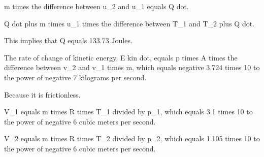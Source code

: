 m times the difference between u_2 and u_1 equals Q dot.

Q dot plus m times u_1 times the difference between T_1 and T_2 plus Q dot.

This implies that Q equals 133.73 Joules.

The rate of change of kinetic energy, E kin dot, equals p times A times the difference between v_2 and v_1 times m, which equals negative 3.724 times 10 to the power of negative 7 kilograms per second.

Because it is frictionless.

V_1 equals m times R times T_1 divided by p_1, which equals 3.1 times 10 to the power of negative 6 cubic meters per second.

V_2 equals m times R times T_2 divided by p_2, which equals 1.105 times 10 to the power of negative 6 cubic meters per second.